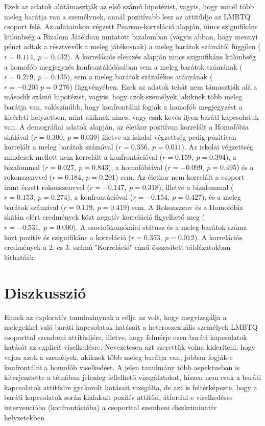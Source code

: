 Ezek az adatok alátámasztják az első számú hipotézist, vagyis, hogy minél több meleg barátja van a személynek, annál pozitívabb lesz az attitűdje az LMBTQ csoport felé.  Az adatainkon végzett Pearson-korreláció alapján, nincs szignifikáns különbség a Bizalom Játékban mutatott bizalomban (vagyis abban, hogy mennyi pénzt adtak a résztvevők a meleg játékosnak) a meleg barátok számától függően ($r=0.114, \ p=0.432$). A korrelációs elemzés alapján nincs szignifikáns különbség a  homofób megjegyzés konfrontálódásában sem a meleg barátok számának ($r=0.279, \ p=0.135$), sem a meleg barátok százalékos arányának ($r=-0.205 \ p=0.276$) függvényében. Ezek az adatok tehát nem támasztják alá a második számú hipotézist, vagyis, hogy azok személyek, akiknek több meleg barátja van, valószínűbb, hogy konfrontálni fogják a homofób megjegyzést a kísérleti helyzetben, mint akiknek nincs, vagy csak kevés ilyen baráti kapcsolatuk van. A demográfiai adatok alapján, az életkor pozitívan korrelált a Homofóbia skálával ($r=0.300, \  p=0.039$) illetve az iskolai végzettség pedig pozitívan korrelált a meleg barátok számával ($r=0.356, \  p=0.011$). Az iskolai végzettség mindezek mellett nem korrelált a konfrontációval ($r=0.159, \  p=0.394$), a bizalommal ($r=0.027, \  p=0.843$), a homofóbiával ($r=-0.099, \  p=0.495$) és a rokonszenvvel ($r=0.184, \  p=0.201$) sem. Az életkor nem korrelált a csoport iránt érzett rokonszenvvel ($r=-0.147, \ p=0.318$), illetve a bizalommal ($r=0.153, \  p=0.274$), a konfrontációval ($r=-0.154, \  p=0.427$), és a meleg barátok számával ($r=0.119, \  p=0.419$) sem. A Rokonszenv és a Homofóbia skálán elért eredmények közt negatív korreláció figyelhető meg ($r=-0.531, \  p=0.000$). A szocioökomómiai státusz és a meleg barátok száma közt pozitív és szignifikáns a korreláció ($r=0.353, \  p=0.012$). A korrelációs eredmények a 2. és 3. számú "Korreláció" című összesített táblázatokban láthatóak.
\page

\section{Diszkusszió}
Ennek az exploratív tanulmánynak a célja az volt, hogy megvizsgálja a melegekkel való baráti kapcsolatok hatásait a heteroszexuális személyek LMBTQ csoporttal szembeni attitűdjére, illetve, hogy felmérje ezen baráti kapcsolatok hatását az explicit viselkedésre. Nevezetesen azt szerettük volna kideríteni, hogy vajon azok a személyek, akiknek több meleg barátja van, jobban fogják-e konfrontálni a homofób viselkedést. A jelen tanulmány több aspektusban is kiterjesztette a témában jelenleg fellelhető vizsgálatokat, hiszen nem csak a baráti kapcsolatok attitűdre gyakorolt hatásait vizsgálta, de azt is feltérképezte, hogy a baráti kapcsolatok során kialakult pozitív attitűd, átfordul-e viselkedéses intervencióba (konfrontációba) a csoporttal szembeni diszkriminatív helyzetekben.

